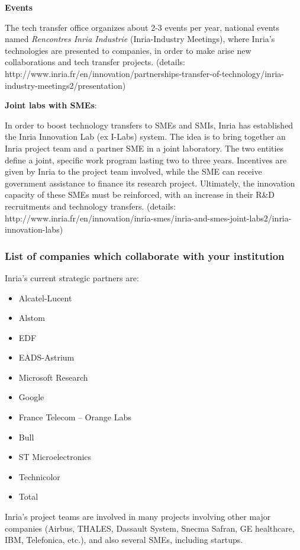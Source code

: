 \documentclass[12pt,a4paper,twoside]{article}
\begin{document}
\textbf{Events}

The tech transfer office organizes about 2-3 events per year, national events named \textit{Rencontres Inria Industrie} (Inria-Industry Meetings), where Inria's technologies are presented to companies, in order to make arise new collaborations and tech transfer projects. (details: http://www.inria.fr/en/innovation/partnerships-transfer-of-technology/inria-industry-meetings2/presentation)
\medskip

\textbf{Joint labs with SMEs}:

In order to boost technology transfers to SMEs and SMIs, Inria has established the Inria Innovation Lab (ex I-Labs) system. The idea is to bring together an Inria project team and a partner SME in a joint laboratory. The two entities define a joint, specific work program lasting two to three years. Incentives are given by Inria to the project team involved, while the SME can receive government assistance to finance its research project.
Ultimately, the innovation capacity of these SMEs must be reinforced, with an increase in their R\&D recruitments and technology transfers. (details: http://www.inria.fr/en/innovation/inria-smes/inria-and-smes-joint-labs2/inria-innovation-labs)

\subsubsection{List of companies which collaborate with your institution}
Inria's current strategic partners are:
\begin{itemize}
\item Alcatel-Lucent 
\item Alstom 
\item EDF
\item EADS-Astrium 
\item Microsoft Research
\item Google
\item France Telecom – Orange Labs
\item Bull 
\item ST Microelectronics 
\item Technicolor
\item Total
\end{itemize}

Inria's project teams are involved in many projects involving other major companies (Airbus, THALES, Dassault System, Snecma Safran, GE healthcare, IBM, Telefonica, etc.), and also several SMEs, including startups. 
\end{document}
